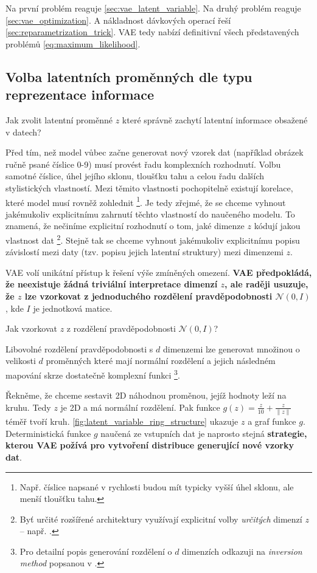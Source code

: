 Na první problém reaguje \autoref{sec:vae_latent_variable}.
Na druhý problém reaguje \autoref{sec:vae_optimization}. A nákladnost dávkových operací řeší \autoref{sec:reparametrization_trick}.
VAE tedy nabízí definitivní všech představených problémů \autoref{eq:maximum_likelihood}. 

\subsection{Volba latentních proměnných dle typu reprezentace informace}
\label{sec:vae_latent_variable}
Jak zvolit latentní proměnné $z$ které správně zachytí latentní informace obsažené v datech?

Před tím, než model vůbec začne generovat nový vzorek dat (například obrázek ručně psané číslice 0-9) musí provést řadu komplexních rozhodnutí.
Volbu samotné číslice, úhel jejího sklonu, tloušťku tahu a celou řadu dalších stylistických vlastností.
Mezi těmito vlastnosti pochopitelně existují korelace, které model musí rovněž zohlednit
\footnote{Např. číslice napsané v rychlosti budou mít typicky vyšší úhel sklonu, ale menší tloušťku tahu.}.
Je tedy zřejmé, že se chceme vyhnout jakémukoliv explicitnímu zahrnutí těchto vlastností do naučeného modelu.
To znamená, že nečiníme explicitní rozhodnutí o tom, jaké dimenze $z$ kódují jakou vlastnost dat
\footnote{Byť určité rozšířené architektury využívají explicitní volby \emph{určitých} dimenzí $z$ – např. \cite{Kulkarni2015}.}.
Stejně tak se chceme vyhnout jakémukoliv explicitnímu popisu závislostí mezi daty (tzv. popisu jejich latentní struktury) mezi dimenzemi $z$. \cite{Doersch2021}

VAE volí unikátní přístup k řešení výše zmíněných omezení. \textbf{VAE předpokládá, že neexistuje žádná triviální interpretace dimenzí $z$, ale raději usuzuje, že $z$ lze vzorkovat z jednoduchého rozdělení pravděpodobnosti $\mathcal{N}(0, I)$}, kde $I$ je jednotková matice. \cite{Doersch2021}

Jak vzorkovat $z$ z rozdělení pravděpodobnosti $\mathcal{N}(0, I)$?

Libovolné rozdělení pravděpodobnosti s $d$ dimenzemi lze generovat množinou o velikosti $d$ proměnných které mají normální rozdělení a jejich následném mapování skrze dostatečně komplexní funkci
\footnote{Pro detailní popis generování rozdělení o $d$ dimenzích odkazuji na \emph{inversion method} popsanou v \cite{Devroye1986}.}.

Řekněme, že chceme sestavit 2D náhodnou proměnou, jejíž hodnoty leží na kruhu.
Tedy $z$ je 2D a má normální rozdělení. Pak funkce $g(z) = \frac{z}{10} + \frac{z}{\| z \|}$ téměř tvoří kruh.
\autoref{fig:latent_variable_ring_structure} ukazuje $z$ a graf funkce $g$.
Deterministická funkce $g$ naučená ze vstupních dat je naprosto stejná \textbf{strategie, kterou VAE požívá pro vytvoření distribuce generující nové vzorky dat}.  \cite{Doersch2021}

